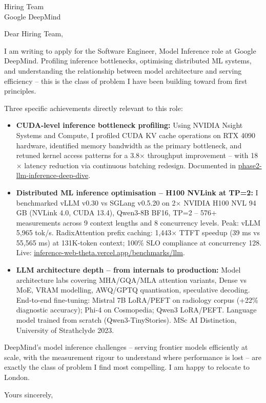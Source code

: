 \documentclass[a4paper]{letter}
\date{\today}
\begin{document}
\begin{letter}{Hiring Team \\ Google DeepMind}

\opening{Dear Hiring Team,}

I am writing to apply for the Software Engineer, Model Inference role at Google DeepMind. Profiling inference bottlenecks, optimising distributed ML systems, and understanding the relationship between model architecture and serving efficiency -- this is the class of problem I have been building toward from first principles.

Three specific achievements directly relevant to this role:

\begin{itemize}
  \item \textbf{CUDA-level inference bottleneck profiling:} Using NVIDIA Nsight Systems and Compute, I profiled CUDA KV cache operations on RTX 4090 hardware, identified memory bandwidth as the primary bottleneck, and retuned kernel access patterns for a 3.8$\times$ throughput improvement -- with 18$\times$ latency reduction via continuous batching redesign. Documented in \href{https://github.com/AyeniOluwatosinOlawale/phase2-llm-inference-deep-dive}{phase2-llm-inference-deep-dive}.

  \item \textbf{Distributed ML inference optimisation -- H100 NVLink at TP=2:} I benchmarked vLLM v0.30 vs SGLang v0.5.20 on 2$\times$ NVIDIA H100 NVL 94 GB (NVLink 4.0, CUDA 13.4), Qwen3-8B BF16, TP=2 -- 576+ measurements across 9 context lengths and 8 concurrency levels. Peak: vLLM 5,965 tok/s. RadixAttention prefix caching: 1,443$\times$ TTFT speedup (39 ms vs 55,565 ms) at 131K-token context; 100\% SLO compliance at concurrency 128. Live: \href{https://inference-web-theta.vercel.app/benchmarks/llm}{inference-web-theta.vercel.app/benchmarks/llm}.

  \item \textbf{LLM architecture depth -- from internals to production:} Model architecture labs covering MHA/GQA/MLA attention variants, Dense vs MoE, VRAM modelling, AWQ/GPTQ quantisation, speculative decoding. End-to-end fine-tuning: Mistral 7B LoRA/PEFT on radiology corpus (+22\% diagnostic accuracy); Phi-4 on Cosmopedia; Qwen3 LoRA/PEFT. Language model trained from scratch (Qwen3-TinyStories). MSc AI Distinction, University of Strathclyde 2023.
\end{itemize}

DeepMind's model inference challenges -- serving frontier models efficiently at scale, with the measurement rigour to understand where performance is lost -- are exactly the class of problem I find most compelling. I am happy to relocate to London.

\closing{Yours sincerely,}

\end{letter}
\end{document}
